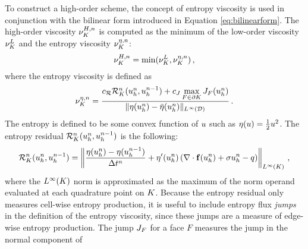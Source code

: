 To construct a high-order scheme, the concept of entropy viscosity is used in
conjunction with the bilinear form introduced in Equation
\eqref{eq:bilinearform}.  The high-order viscosity
$\highordercellviscosity[\timeindex]$ is computed as the minimum of the
low-order viscosity $\lowordercellviscosity$ and the entropy viscosity
$\entropycellviscosity[\timeindex]$:
\begin{equation}\label{eq:high_order_viscosity}
   \highordercellviscosity[\timeindex] = \min(\lowordercellviscosity,
   \entropycellviscosity[\timeindex]) \eqc
\end{equation}
where the entropy viscosity is defined as
\begin{equation}
   \entropycellviscosity[n] = \frac{\entropyresidualcoef
   \entropyresidual_\cellindex^\timeindex(\approximatescalarsolution^\timeindex,
   \approximatescalarsolution^{\timeindex-1})
   + \entropyjumpcoef\max\limits_{F\in\partial \cellindex}\entropyjump_F(
   \approximatescalarsolution^\timeindex)}
   {\|\entropy(\approximatescalarsolution^\timeindex)
   -\bar{\entropy}(\approximatescalarsolution^\timeindex)\|_{L^\infty(\domain)}}
   \eqp
\end{equation}
The entropy is defined to be some convex function of $\scalarsolution$ such as
$\entropy(\scalarsolution)=\frac{1}{2}\scalarsolution^2$. The entropy residual
$\entropyresidual_\cellindex^\timeindex(\approximatescalarsolution^\timeindex,
\approximatescalarsolution^{\timeindex-1})$ is the following:
\begin{equation}
  \entropyresidual_\cellindex^\timeindex(\approximatescalarsolution^\timeindex,
  \approximatescalarsolution^{\timeindex-1})
  = \left\|\frac{\entropy(\approximatescalarsolution^\timeindex)
  - \entropy(\approximatescalarsolution^{\timeindex-1})} 
  {\timestepsize^\timeindex}
  + \entropy'(\approximatescalarsolution^\timeindex)\pr{
  \divergence\consfluxscalar[\approximatescalarsolution^\timeindex]
  + \reactioncoef \approximatescalarsolution^\timeindex
  - \scalarsource}\right\|_{L^\infty(\cellindex)} \eqc
\end{equation}
where the $L^\infty(\cellindex)$ norm is approximated as the maximum of the
norm operand evaluated at each quadrature point on $\cellindex$.  Because the
entropy residual only measures cell-wise entropy production, it is useful to
include entropy flux \emph{jumps} in the definition of the entropy viscosity,
since these jumps are a measure of edge-wise entropy production.  The jump
$\entropyjump_F$ for a face $F$ measures the jump in the normal component of
